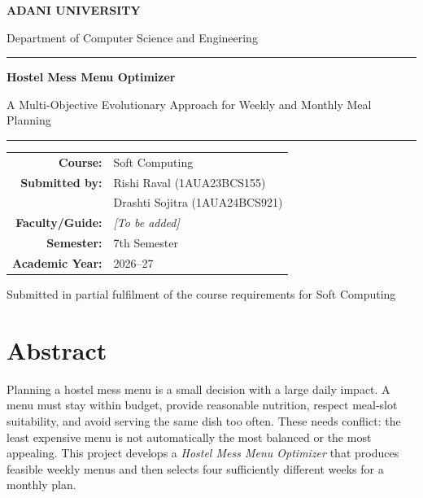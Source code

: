 \documentclass[12pt,a4paper]{report}
\begin{document}
\begin{titlepage}
\centering
\vspace*{1.1cm}
{\Large \textbf{ADANI UNIVERSITY} \par}
\vspace{0.25cm}
{\large Department of Computer Science and Engineering \par}
\vfill
{\color{auteal}\rule{0.76\textwidth}{1.2pt}\par}
\vspace{0.6cm}
{\Huge\bfseries Hostel Mess Menu Optimizer\par}
\vspace{0.35cm}
{\Large A Multi-Objective Evolutionary Approach for Weekly and Monthly Meal Planning\par}
\vspace{0.6cm}
{\color{auteal}\rule{0.76\textwidth}{1.2pt}\par}
\vfill
\begin{tabular}{rl}
\textbf{Course:} & Soft Computing\\[0.3cm]
\textbf{Submitted by:} & Rishi Raval \hspace{1.2cm} (1AUA23BCS155)\\
& Drashti Sojitra \hspace{0.8cm} (1AUA24BCS921)\\[0.3cm]
\textbf{Faculty/Guide:} & \textit{[To be added]}\\[0.3cm]
\textbf{Semester:} & 7th Semester\\
\textbf{Academic Year:} & 2026--27
\end{tabular}
\vfill
{\large Submitted in partial fulfilment of the course requirements for Soft Computing\par}
\vspace*{0.7cm}
\end{titlepage}

\tableofcontents
\listoffigures
\listoftables
\clearpage
{}

\chapter{Abstract}
Planning a hostel mess menu is a small decision with a large daily impact. A menu must stay within budget, provide reasonable nutrition, respect meal-slot suitability, and avoid serving the same dish too often. These needs conflict: the least expensive menu is not automatically the most balanced or the most appealing. This project develops a \textit{Hostel Mess Menu Optimizer} that produces feasible weekly menus and then selects four sufficiently different weeks for a monthly plan.
\end{document}
